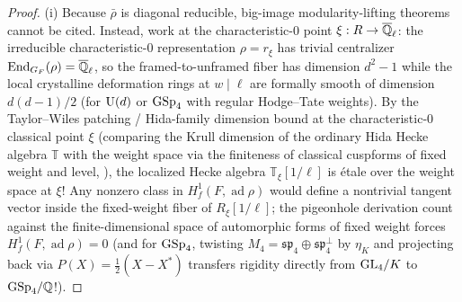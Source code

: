 \begin{proof}
(i) Because $\bar{\rho}$ is diagonal reducible, big-image modularity-lifting theorems cannot be cited. Instead, work at the characteristic-$0$ point $\xi : R \to \overline{\mathbb{Q}}_\ell$: the irreducible characteristic-$0$ representation $\rho = r_\xi$ has trivial centralizer $\mathrm{End}_{G_F}(\rho) = \overline{\mathbb{Q}}_\ell$, so the framed-to-unframed fiber has dimension $d^2 - 1$ while the local crystalline deformation rings at $w \mid \ell$ are formally smooth of dimension $d(d-1)/2$ (for $\mathrm{U}(d)$ or $\mathrm{GSp}_4$ with regular Hodge--Tate weights). By the Taylor--Wiles patching / Hida-family dimension bound at the characteristic-$0$ classical point $\xi$ (comparing the Krull dimension of the ordinary Hida Hecke algebra $\mathbb{T}$ with the weight space via the finiteness of classical cuspforms of fixed weight and level, \cite{Geraghty2019,BellaicheChenevier2009}), the localized Hecke algebra $\mathbb{T}_\xi[1/\ell]$ is \'etale over the weight space at $\xi$! Any nonzero class in $H^1_f(F, \operatorname{ad}\rho)$ would define a nontrivial tangent vector inside the fixed-weight fiber of $R_\xi[1/\ell]$; the pigeonhole derivation count against the finite-dimensional space of automorphic forms of fixed weight forces $H^1_f(F, \operatorname{ad}\rho) = 0$ (and for $\mathrm{GSp}_4$, twisting $M_4 = \mathfrak{sp}_4 \oplus \mathfrak{sp}_4^\perp$ by $\eta_K$ and projecting back via $P(X) = \frac{1}{2}(X - X^*)$ transfers rigidity directly from $\mathrm{GL}_4/K$ to $\mathrm{GSp}_4/\mathbb{Q}$!).


\end{proof}
